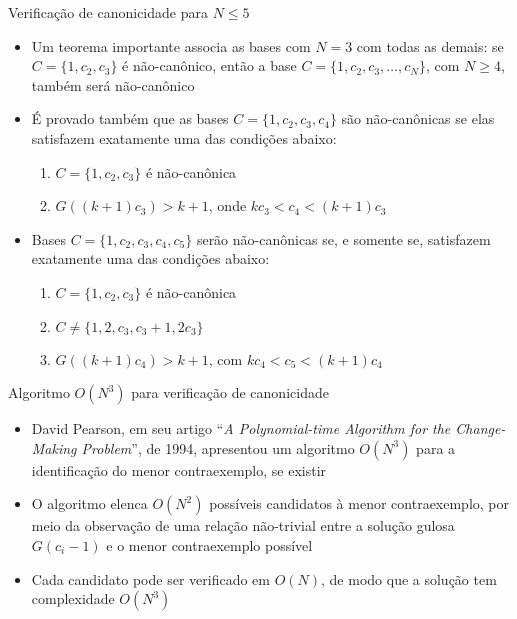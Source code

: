 \begin{frame}[fragile]{Verificação de canonicidade para $N \leq 5$}

    \begin{itemize}
        \item Um teorema importante associa as bases com $N = 3$ com todas as demais: se 
            $C = \{ 1, c_2, c_3 \}$ é não-canônico, então a base $C = \{ 1, c_2, c_3, \ldots,
                c_N \}$, com $N \geq 4$, também será não-canônico

        \item É provado também que as bases $C = \{ 1, c_2, c_3, c_4 \}$ são não-canônicas se elas
            satisfazem exatamente uma das condições abaixo:
        \begin{enumerate}
            \item $C = \{ 1, c_2, c_3 \}$ é não-canônica
            \item $G((k+1)c_3) > k + 1$, onde $kc_3 < c_4 < (k + 1)c_3$
        \end{enumerate}
        
        \item Bases $C = \{ 1, c_2, c_3, c_4, c_5 \}$ serão não-canônicas se, e somente se, 
            satisfazem exatamente uma das condições abaixo:
        \begin{enumerate}
            \item $C = \{ 1, c_2, c_3 \}$ é não-canônica
            \item $C \neq \{ 1, 2, c_3, c_3 + 1, 2c_3 \}$
            \item $G((k + 1)c_4) > k + 1$, com $kc_4 < c_5 < (k + 1)c_4$
        \end{enumerate}
    \end{itemize}

\end{frame}

\begin{frame}[fragile]{Algoritmo $O(N^3)$ para verificação de canonicidade}

    \begin{itemize}
        \item David Pearson, em seu artigo ``\textit{A Polynomial-time Algorithm for the
            Change-Making Problem}'', de 1994, apresentou um algoritmo $O(N^3)$ para a identificação
            do menor contraexemplo, se existir

        \item O algoritmo elenca $O(N^2)$ possíveis candidatos à menor contraexemplo, por meio
            da observação de uma relação não-trivial entre a solução gulosa $G(c_i - 1)$ e o menor
            contraexemplo possível

        \item Cada candidato pode ser verificado em $O(N)$, de modo que a solução tem complexidade
            $O(N^3)$

    \end{itemize}

\end{frame}

